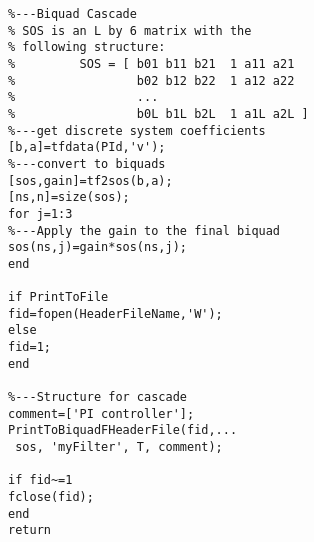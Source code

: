 \begin{verbatim}
%---Biquad Cascade
% SOS is an L by 6 matrix with the 
% following structure:
%         SOS = [ b01 b11 b21  1 a11 a21  
%                 b02 b12 b22  1 a12 a22
%                 ...
%                 b0L b1L b2L  1 a1L a2L ]
%---get discrete system coefficients
[b,a]=tfdata(PId,'v');      
%---convert to biquads 
[sos,gain]=tf2sos(b,a);     
[ns,n]=size(sos);
for j=1:3                   
%---Apply the gain to the final biquad
sos(ns,j)=gain*sos(ns,j);
end

if PrintToFile
fid=fopen(HeaderFileName,'W');    
else
fid=1;   
end

%---Structure for cascade
comment=['PI controller'];
PrintToBiquadFHeaderFile(fid,...
 sos, 'myFilter', T, comment);

if fid~=1
fclose(fid);
end 
return
\end{verbatim}
